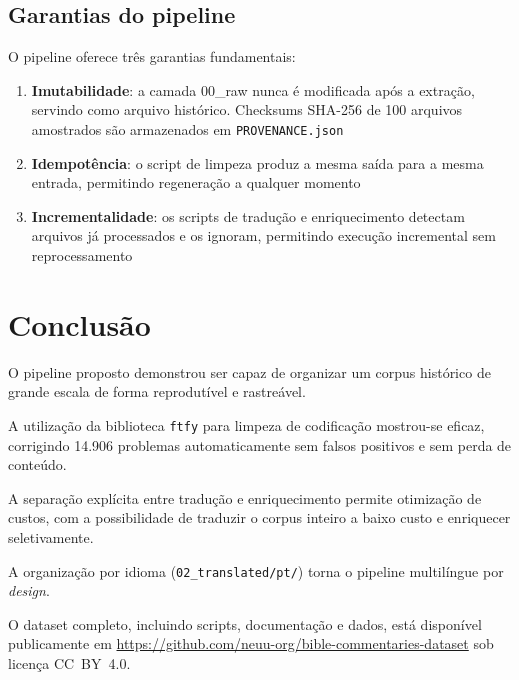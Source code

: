 \documentclass[11pt,a4paper]{article}
\begin{document}
\subsection{Garantias do pipeline}

O pipeline oferece tr\^{e}s garantias fundamentais:

\begin{enumerate}[leftmargin=1.25cm]
\item \textbf{Imutabilidade}: a camada 00\_raw nunca \'{e} modificada ap\'{o}s a extra\c{c}\~{a}o, servindo como arquivo hist\'{o}rico. Checksums SHA-256 de 100 arquivos amostrados s\~{a}o armazenados em \texttt{PROVENANCE.json}
\item \textbf{Idempot\^{e}ncia}: o script de limpeza produz a mesma sa\'{i}da para a mesma entrada, permitindo regenera\c{c}\~{a}o a qualquer momento
\item \textbf{Incrementalidade}: os scripts de tradu\c{c}\~{a}o e enriquecimento detectam arquivos j\'{a} processados e os ignoram, permitindo execu\c{c}\~{a}o incremental sem reprocessamento
\end{enumerate}

\section{Conclus\~{a}o}

O pipeline proposto demonstrou ser capaz de organizar um corpus hist\'{o}rico de grande escala de forma reprodut\'{i}vel e rastre\'{a}vel.

A utiliza\c{c}\~{a}o da biblioteca \texttt{ftfy} para limpeza de codifica\c{c}\~{a}o mostrou-se eficaz, corrigindo 14.906 problemas automaticamente sem falsos positivos e sem perda de conte\'{u}do.

A separa\c{c}\~{a}o expl\'{i}cita entre tradu\c{c}\~{a}o e enriquecimento permite otimiza\c{c}\~{a}o de custos, com a possibilidade de traduzir o corpus inteiro a baixo custo e enriquecer seletivamente.

A organiza\c{c}\~{a}o por idioma (\texttt{02\_translated/pt/}) torna o pipeline multilíngue por \textit{design}.

O dataset completo, incluindo scripts, documenta\c{c}\~{a}o e dados, est\'{a} dispon\'{i}vel publicamente em \url{https://github.com/neuu-org/bible-commentaries-dataset} sob licen\c{c}a CC~BY~4.0.
\end{document}
